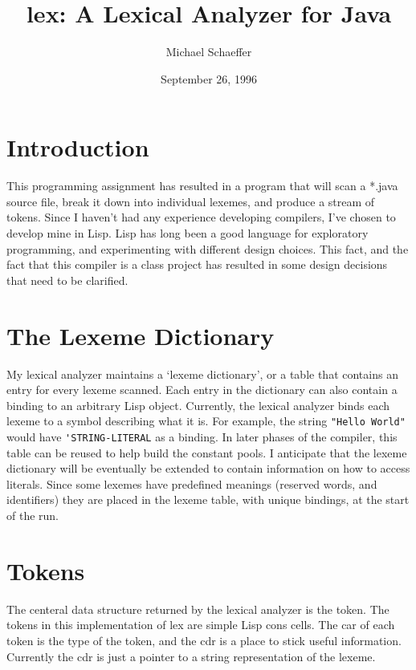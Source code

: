 \documentclass{article}[1994/05/24]
\title{lex: A Lexical Analyzer for Java}
\author{Michael Schaeffer}
\date{September 26, 1996}
\begin{document}
\maketitle


\section{Introduction}

	This programming assignment has resulted in a program
that will scan a *.java source file, break it down into individual
lexemes, and produce a stream of tokens.  Since I haven't had any
experience developing compilers, I've chosen to develop mine in
Lisp. Lisp has long been a good language for exploratory
programming, and experimenting with different design choices. This
fact, and the fact that this compiler is a class project has
resulted in some design decisions that need to be clarified.

\section{The Lexeme Dictionary}

	My lexical analyzer maintains a `lexeme dictionary', or a
table that contains an entry for every lexeme scanned. Each entry
in the dictionary can also contain a binding to an arbitrary Lisp
object. Currently, the lexical analyzer binds each lexeme to a
symbol describing what it is.  For example, the string
\verb|"Hello World"| would have \verb|'STRING-LITERAL| as a
binding. In later phases of the compiler, this table can be reused
to help build the constant pools.  I anticipate that the lexeme
dictionary will be eventually be extended to contain information
on how to access literals. Since some lexemes have predefined
meanings (reserved words, and identifiers) they are placed in the
lexeme table, with unique bindings, at the start of the run.

\section{Tokens}

	The centeral data structure returned by the lexical
analyzer is the token.  The tokens in this implementation of lex
are simple Lisp cons cells.  The car of each token is the type of
the token, and the cdr is a place to stick useful information.
Currently the cdr is just a pointer to a string representation of
the lexeme.
\end{document}
